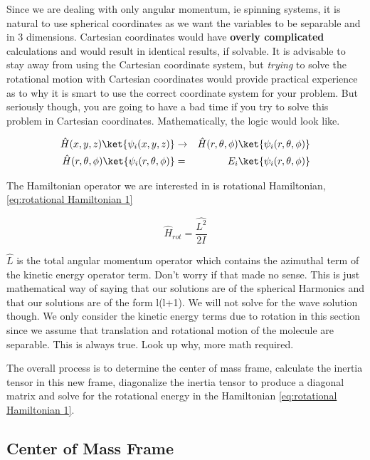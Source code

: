 \documentclass[11pt,a4paper]{book}
\begin{document}
			Since we are dealing with only angular momentum, ie spinning systems, it is natural to use spherical coordinates as we want the variables to be separable and in 3 dimensions. Cartesian coordinates would have \textbf{overly complicated} calculations and would result in identical results, if solvable. It is advisable to stay away from using the Cartesian coordinate system, but \textit{trying} to solve the rotational motion with Cartesian coordinates would provide practical experience as to why it is smart to use the correct coordinate system for your problem. But seriously though, you are going to have a bad time if you try to solve this problem in Cartesian coordinates. Mathematically, the logic would look like.
			
			\begin{eqnarray}
				\label{eq:setting-up-hamiltonian}
				\hat{H} (x, y , z) \ket{\psi_i(x, y , z)} 
				&\rightarrow&
				\hat{H} (r,\theta, \phi) \ket{\psi_i(r,\theta, \phi)}
				\\
				\hat{H} (r,\theta, \phi) \ket{\psi_i(r,\theta, \phi)} 
				&=& 
				E_i\ket{\psi_i(r,\theta, \phi)}
			\end{eqnarray}	
			
			The Hamiltonian operator we are interested in is rotational Hamiltonian,\autoref{eq:rotational Hamiltonian 1}
			
			\begin{equation}
				\label{eq:rotational Hamiltonian 1}
				\hat{H}_{rot} = \dfrac{\hat{L^2}}{2I}
			\end{equation}
			
			$\hat{L}$ is the total angular momentum operator which contains the azimuthal term of the kinetic energy operator term. Don't worry if that made no sense. This is just  mathematical way of saying that our solutions are of the spherical Harmonics and that our solutions are of the form l(l+1). We will not solve for the wave solution though. We only consider the kinetic energy terms due to rotation in this section since we assume that translation and rotational motion of the molecule are separable. This is always true. Look up why, more math required. 
			
			The overall process is to determine the center of mass frame, calculate the inertia tensor in this new frame, diagonalize the inertia tensor to produce a diagonal matrix and solve for the rotational energy in the Hamiltonian \autoref{eq:rotational Hamiltonian 1}. 			
			
		\subsection{Center of Mass Frame}
			\label{subsec:Center of Mass Frame}
			
\end{document}
